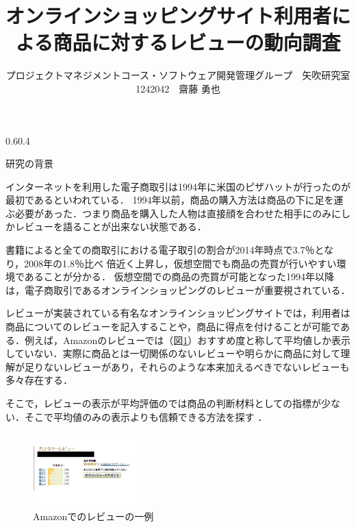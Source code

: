 \documentclass[uplatex,twocolumn]{jsarticle}
\title{\vspace{-5mm}\fontsize{14pt}{0pt}\selectfont オンラインショッピングサイト利用者による商品に対するレビューの動向調査}
\author{\normalsize プロジェクトマネジメントコース・ソフトウェア開発管理グループ　矢吹研究室　1242042　齋藤 勇也}
\date{}
\makeatletter
\renewcommand{\section}{%
  \@startsection{section}{1}{\z@}%
  {0.6\Cvs}{0.4\Cvs}%
  {\normalfont\normalsize\raggedright}}
\makeatother
\begin{document}
\fontsize{10.5pt}{\baselineskip}\selectfont
\maketitle






\section{研究の背景}




インターネットを利用した電子商取引は1994年に米国のピザハットが行ったのが最初であるといわれている\cite{sugasaka2003}．
1994年以前，商品の購入方法は商品の下に足を運ぶ必要があった．つまり商品を購入した人物は直接顔を合わせた相手にのみにしかレビューを語ることが出来ない状態である．

書籍によると全ての商取引における電子取引の割合が2014年時点で3.7％となり，2008年の1.8％比べ 倍近く上昇し，仮想空間でも商品の売買が行いやすい環境であることが分かる\cite{keizai2014}．
仮想空間での商品の売買が可能となった1994年以降は，電子商取引であるオンラインショッピングのレビューが重要視されている．


レビューが実装されている有名なオンラインショッピングサイトでは，利用者は商品についてのレビューを記入することや，商品に得点を付けることが可能である．例えば，Amazonのレビューでは（図\ref{customerReview}）おすすめ度と称して平均値しか表示していない．実際に商品とは一切関係のないレビューや明らかに商品に対して理解が足りないレビューがあり，それらのような本来加えるべきでないレビューも多々存在する．

そこで，レビューの表示が平均評価のでは商品の判断材料としての指標が少ない．そこで平均値のみの表示よりも信頼できる方法を探す\cite{hattori2011} \cite{yamazawa2006}．


\begin{figure}[htbp]
\begin{flushleft} %
\vspace*{-\intextsep}
\includegraphics[width=4cm,clip]{customerReview.pdf}
\caption{Amazonでのレビューの一例}
\label{customerReview}
\end{flushleft}
\end{figure}
\end{document}
